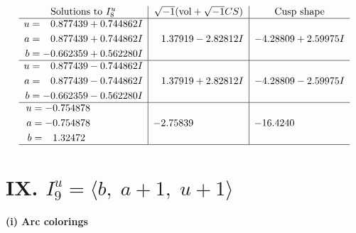 \documentclass[1p]{elsarticle_modified}
\theoremstyle{definition}
\newcommand{\I}{\sqrt{-1}}
\begin{document}
$$\begin{array}{c|c|c}  
\text{Solutions to }I^u_{8}& \I (\text{vol} + \sqrt{-1}CS) & \text{Cusp shape}\\
 \hline 
\begin{aligned}
u &= \phantom{-}0.877439 + 0.744862 I \\
a &= \phantom{-}0.877439 + 0.744862 I \\
b &= -0.662359 + 0.562280 I\end{aligned}
 & \phantom{-}1.37919 - 2.82812 I & -4.28809 + 2.59975 I \\ \hline\begin{aligned}
u &= \phantom{-}0.877439 - 0.744862 I \\
a &= \phantom{-}0.877439 - 0.744862 I \\
b &= -0.662359 - 0.562280 I\end{aligned}
 & \phantom{-}1.37919 + 2.82812 I & -4.28809 - 2.59975 I \\ \hline\begin{aligned}
u &= -0.754878\phantom{ +0.000000I} \\
a &= -0.754878\phantom{ +0.000000I} \\
b &= \phantom{-}1.32472\phantom{ +0.000000I}\end{aligned}
 & -2.75839\phantom{ +0.000000I} & -16.4240\phantom{ +0.000000I}\\
 \hline 
 \end{array}$$\newpage\newpage\renewcommand{\arraystretch}{1}
\centering \section*{IX. $I^u_{9}= \langle b,\;a+1,\;u+1 \rangle$}
\flushleft \textbf{(i) Arc colorings}\\
\end{document}
